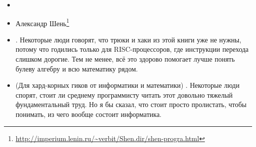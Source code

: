\begin{itemize}

\item \RobPikePractice

\item Александр Шень\footnote{\url{http://imperium.lenin.ru/~verbit/Shen.dir/shen-progra.html}}

\item \HenryWarren.
Некоторые люди говорят, что трюки и хаки из этой книги уже не нужны, потому что годились только для \ac{RISC}-процессоров,
где инструкции перехода слишком дорогие.
Тем не менее, всё это здорово помогает лучше понять булеву алгебру и всю математику рядом.

\item (Для хард-корных гиков от информатики и математики) \TAOCP.
Некоторые люди спорят, стоит ли среднему программисту читать этот довольно тяжелый фундаментальный труд.
Но я бы сказал, что стоит просто пролистать, чтобы понимать, из чего вообще состоит информатика.

\end{itemize}



\iffalse
\subsection{Посвящение}

Как написано на первой странице этой книги, ``Эта книга посвящается Роберту Джордейну, Джону Соухэ, Ральфу Брауну и Питеру Абелю''.
Это авторы хорошо известных книг и справочников по языку ассемблеру из 1980-х и 1990-х:

\begin{itemize}
\item Роберт Джордейн -- Справочник программиста персональных компьютеров типа IBM PC, XT и AT (1986, в бывшем СССР издался в 1992)

\item Питер Нортон и Джон Соухэ -- Персональный компьютер фирмы IBM и операционная система MS-DOS (в бывшем ССР издалась в 1991), Язык ассемблера для IBM PC (там же издалась в 1992)
На самом деле, Джон Соухэ настоящий автор этих книг, можно сказать, он был литературным негром.
Также он настоящий автор Norton Commander-а.

\item Ральф Браун был известен справочником по прерываниям MS-DOS и BIOS -- ``Ralf Brown's Interrupt List''\footnote{\url{http://www.ctyme.com/rbrown.htm}}.

\item Питер Абель -- Ассемблер и программирование для IBM PC (в бывшем СССР издалась в 1992)
\end{itemize}

Это всё устаревшие книги, конечно.
Но может быть кто-то вспомнит ``те времена''.
\fi


